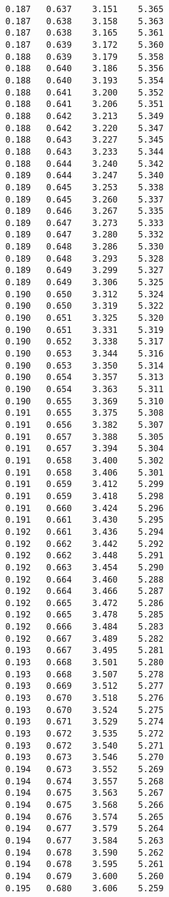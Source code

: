 \begin{verbatim}
   0.187   0.637    3.151    5.365
   0.187   0.638    3.158    5.363
   0.187   0.638    3.165    5.361
   0.187   0.639    3.172    5.360
   0.188   0.639    3.179    5.358
   0.188   0.640    3.186    5.356
   0.188   0.640    3.193    5.354
   0.188   0.641    3.200    5.352
   0.188   0.641    3.206    5.351
   0.188   0.642    3.213    5.349
   0.188   0.642    3.220    5.347
   0.188   0.643    3.227    5.345
   0.188   0.643    3.233    5.344
   0.188   0.644    3.240    5.342
   0.189   0.644    3.247    5.340
   0.189   0.645    3.253    5.338
   0.189   0.645    3.260    5.337
   0.189   0.646    3.267    5.335
   0.189   0.647    3.273    5.333
   0.189   0.647    3.280    5.332
   0.189   0.648    3.286    5.330
   0.189   0.648    3.293    5.328
   0.189   0.649    3.299    5.327
   0.189   0.649    3.306    5.325
   0.190   0.650    3.312    5.324
   0.190   0.650    3.319    5.322
   0.190   0.651    3.325    5.320
   0.190   0.651    3.331    5.319
   0.190   0.652    3.338    5.317
   0.190   0.653    3.344    5.316
   0.190   0.653    3.350    5.314
   0.190   0.654    3.357    5.313
   0.190   0.654    3.363    5.311
   0.190   0.655    3.369    5.310
   0.191   0.655    3.375    5.308
   0.191   0.656    3.382    5.307
   0.191   0.657    3.388    5.305
   0.191   0.657    3.394    5.304
   0.191   0.658    3.400    5.302
   0.191   0.658    3.406    5.301
   0.191   0.659    3.412    5.299
   0.191   0.659    3.418    5.298
   0.191   0.660    3.424    5.296
   0.191   0.661    3.430    5.295
   0.192   0.661    3.436    5.294
   0.192   0.662    3.442    5.292
   0.192   0.662    3.448    5.291
   0.192   0.663    3.454    5.290
   0.192   0.664    3.460    5.288
   0.192   0.664    3.466    5.287
   0.192   0.665    3.472    5.286
   0.192   0.665    3.478    5.285
   0.192   0.666    3.484    5.283
   0.192   0.667    3.489    5.282
   0.193   0.667    3.495    5.281
   0.193   0.668    3.501    5.280
   0.193   0.668    3.507    5.278
   0.193   0.669    3.512    5.277
   0.193   0.670    3.518    5.276
   0.193   0.670    3.524    5.275
   0.193   0.671    3.529    5.274
   0.193   0.672    3.535    5.272
   0.193   0.672    3.540    5.271
   0.193   0.673    3.546    5.270
   0.194   0.673    3.552    5.269
   0.194   0.674    3.557    5.268
   0.194   0.675    3.563    5.267
   0.194   0.675    3.568    5.266
   0.194   0.676    3.574    5.265
   0.194   0.677    3.579    5.264
   0.194   0.677    3.584    5.263
   0.194   0.678    3.590    5.262
   0.194   0.678    3.595    5.261
   0.194   0.679    3.600    5.260
   0.195   0.680    3.606    5.259

\end{verbatim}
